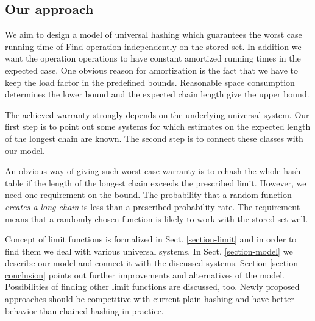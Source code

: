 \subsection{Our approach}
We aim to design a model of universal hashing which guarantees the worst case running time of Find operation independently on the stored set. In addition we want the operation operations to have constant amortized running times in the expected case. One obvious reason for amortization is the fact that we have to keep the load factor in the predefined bounds. Reasonable space consumption determines the lower bound and the expected chain length give the upper bound.

The achieved warranty strongly depends on the underlying universal system. Our first step is to point out some systems for which estimates on the expected length of the longest chain are known. The second step is to connect these classes with our model.

An obvious way of giving such worst case warranty is to rehash the whole hash table if the length of the longest chain exceeds the prescribed limit. However, we need one requirement on the bound. The probability that a random function \emph{creates a long chain} is less than a prescribed probability rate. The requirement means that a randomly chosen function is likely to work with the stored set well.

Concept of limit functions is formalized in Sect. \ref{section-limit} and in order to find them we deal with various universal systems. In Sect. \ref{section-model} we describe our model and connect it with the discussed systems. Section \ref{section-conclusion} points out further improvements and alternatives of the model. Possibilities of finding other limit functions are discussed, too. Newly proposed approaches should be competitive with current plain hashing and have better behavior than chained hashing in practice.
